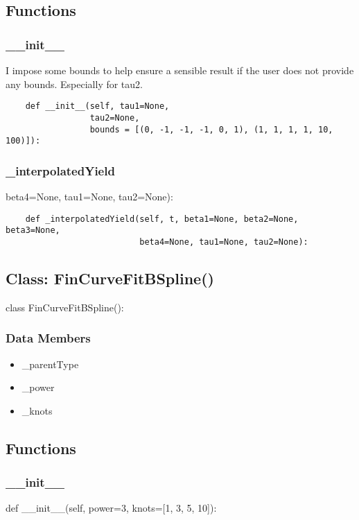 \documentclass[twoside,11pt]{book}
\begin{document}
\subsection*{Functions}

\subsubsection*{{\bf \_\_init\_\_}}
I impose some bounds to help ensure a sensible result if the user does not provide any bounds. Especially for tau2.  

\begin{lstlisting}
    def __init__(self, tau1=None, 
                 tau2=None, 
                 bounds = [(0, -1, -1, -1, 0, 1), (1, 1, 1, 1, 10, 100)]):
\end{lstlisting}

\subsubsection*{{\bf \_interpolatedYield}}
beta4=None, tau1=None, tau2=None): 

\begin{lstlisting}
    def _interpolatedYield(self, t, beta1=None, beta2=None, beta3=None,
                           beta4=None, tau1=None, tau2=None):
\end{lstlisting}

\subsection*{Class: FinCurveFitBSpline()}
class FinCurveFitBSpline(): 

\subsubsection*{Data Members}
\begin{itemize}
\item{\_parentType}
\item{\_power}
\item{\_knots}
\end{itemize}

\subsection*{Functions}

\subsubsection*{{\bf \_\_init\_\_}}
def \_\_init\_\_(self, power=3, knots=[1, 3, 5, 10]): 
\end{document}
